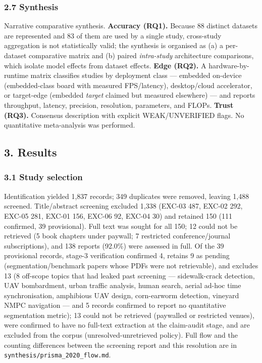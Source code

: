 \documentclass[11pt]{article}
\begin{document}
\subsubsection{2.7 Synthesis}\label{synthesis}

Narrative comparative synthesis. \textbf{Accuracy (RQ1).} Because 88
distinct datasets are represented and 83 of them are used by a single
study, cross-study aggregation is not statistically valid; the synthesis
is organised as (a) a per-dataset comparative matrix and (b) paired
\emph{intra-study} architecture comparisons, which isolate model effects
from dataset effects. \textbf{Edge (RQ2).} A hardware-by-runtime matrix
classifies studies by deployment class --- embedded on-device
(embedded-class board with measured FPS/latency), desktop/cloud
accelerator, or target-edge (embedded \emph{target} claimed but measured
elsewhere) --- and reports throughput, latency, precision, resolution,
parameters, and FLOPs. \textbf{Trust (RQ3).} Consensus description with
explicit WEAK/UNVERIFIED flags. No quantitative meta-analysis was
performed.

\subsection{3. Results}\label{results}

\subsubsection{3.1 Study selection}\label{study-selection}

Identification yielded 1,837 records; 349 duplicates were removed,
leaving 1,488 screened. Title/abstract screening excluded 1,338 (EXC-03
487, EXC-02 292, EXC-05 281, EXC-01 156, EXC-06 92, EXC-04 30) and
retained 150 (111 confirmed, 39 provisional). Full text was sought for
all 150; 12 could not be retrieved (5 book chapters under paywall; 7
restricted conference/journal subscriptions), and 138 reports (92.0\%)
were assessed in full. Of the 39 provisional records, stage-3
verification confirmed 4, retains 9 as pending (segmentation/benchmark
papers whose PDFs were not retrievable), and excludes 13 (8 off-scope
topics that had leaked past screening --- sidewalk-crack detection, UAV
bombardment, urban traffic analysis, human search, aerial ad-hoc time
synchronisation, amphibious UAV design, corn-earworm detection, vineyard
NMPC navigation --- and 5 records confirmed to report no quantitative
segmentation metric); 13 could not be retrieved (paywalled or restricted
venues), were confirmed to have no full-text extraction at the
claim-audit stage, and are excluded from the corpus
(unresolved-unretrieved policy). Full flow and the counting differences
between the screening report and this resolution are in
\texttt{synthesis/prisma\_2020\_flow.md}.
\end{document}
